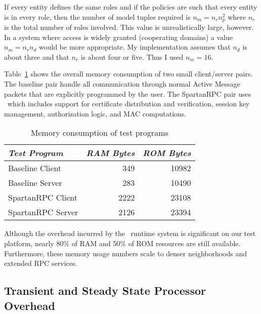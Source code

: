 If every entity defines the same roles and if the policies are such that every entity is in
every role, then the number of model tuples required is $n_m = n_r n_p^2$ where $n_r$ is the
total number of roles involved. This value is unrealistically large, however. In a system where
access is widely granted (cooperating domains) a value $n_m = n_r n_d$ would be more
appropriate. My implementation assumes that $n_d$ is about three and that $n_r$ is about four or
five. Thus I used $n_m = 16$.

Table~\ref{table-test-program-ram} shows the overall memory consumption of two small
client/server pairs. The baseline pair handle all communication through normal Active Message
packets that are explicitly programmed by the user. The SpartanRPC pair uses \Sprocket\ which
includes support for certificate distribution and verification, session key management,
authorization logic, and MAC computations.

\begin{table}[!t]
  \newcommand\T{\rule{0pt}{2.1ex}}
  \centering
  \caption{Memory consumption of test programs}
  {
  \begin{tabular}{|l|r|r|} \hline
    \textit{Test Program} \T & \textit{RAM Bytes} & \textit{ROM Bytes} \\
    \hline \hline

    Baseline Client   \T &  349 & 10982 \\ \hline 
    Baseline Server   \T &  283 & 10490 \\ \hline
    SpartanRPC Client \T & 2222 & 23108 \\ \hline
    SpartanRPC Server \T & 2126 & 23394 \\ \hline
  \end{tabular}
  }
  \label{table-test-program-ram}
\end{table}

Although the overhead incurred by the \Sprocket\ runtime system is significant on our test
platform, nearly 80\% of RAM and 50\% of ROM resources are still available. Furthermore, these
memory usage numbers scale to denser neighborhoods and extended RPC services.


\subsection{Transient and Steady State Processor Overhead}
\label{section-sprocket-cpu-performance}

